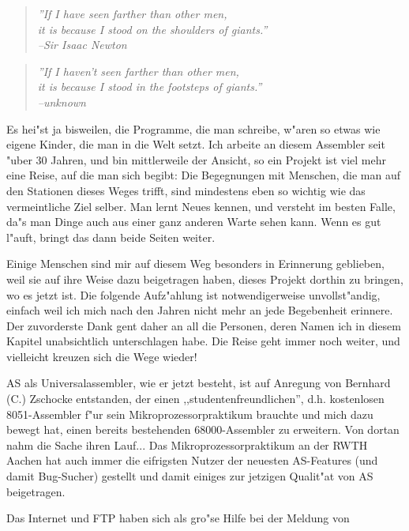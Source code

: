 \documentclass[12pt,a4paper,twoside]{report}
\newcommand{\asname}{AS}
\begin{document}
\begin{quote}{\it
''If I have seen farther than other men, \\
it is because I stood on the shoulders of giants.'' \\
\hspace{2cm} --Sir Isaac Newton}
\end{quote}
\begin{quote}{\it
''If I haven't seen farther than other men, \\
it is because I stood in the footsteps of giants.'' \\
\hspace{2cm} --unknown}
\end{quote}
\par
Es hei"st ja bisweilen, die Programme, die man schreibe, w"aren so
etwas wie eigene Kinder, die man in die Welt setzt.  Ich arbeite an
diesem Assembler seit "uber 30 Jahren, und bin mittlerweile der
Ansicht, so ein Projekt ist viel mehr eine Reise, auf die man sich
begibt: Die Begegnungen mit Menschen, die man auf den Stationen
dieses Weges trifft, sind mindestens eben so wichtig wie das
vermeintliche Ziel selber.  Man lernt Neues kennen, und versteht im
besten Falle, da"s man Dinge auch aus einer ganz anderen Warte sehen
kann.  Wenn es gut l"auft, bringt das dann beide Seiten weiter.
\par
Einige Menschen sind mir auf diesem Weg besonders in Erinnerung
geblieben, weil sie auf ihre Weise dazu beigetragen haben, dieses
Projekt dorthin zu bringen, wo es jetzt ist.  Die folgende Aufz"ahlung
ist notwendigerweise unvollst"andig, einfach weil ich mich nach den
Jahren nicht mehr an jede Begebenheit erinnere.  Der zuvorderste Dank
gent daher an all die Personen, deren Namen ich in diesem Kapitel
unabsichtlich unterschlagen habe.  Die Reise geht immer noch weiter,
und vielleicht kreuzen sich die Wege wieder!
\par
\asname{} als Universalassembler, wie er jetzt besteht, ist auf Anregung von
Bernhard (C.) Zschocke entstanden, der einen ,,studentenfreundlichen'',
d.h. kostenlosen 8051-Assembler f"ur sein Mikroprozessorpraktikum
brauchte und mich dazu bewegt hat, einen bereits bestehenden
68000-Assembler zu erweitern.  Von dortan nahm die Sache ihren Lauf...
Das Mikroprozessorpraktikum an der RWTH Aachen hat auch immer die
eifrigsten Nutzer der neuesten \asname{}-Features (und damit Bug-Sucher)
gestellt und damit einiges zur jetzigen Qualit"at von \asname{} beigetragen.
\par
Das Internet und FTP haben sich als gro"se Hilfe bei der Meldung von
\end{document}
